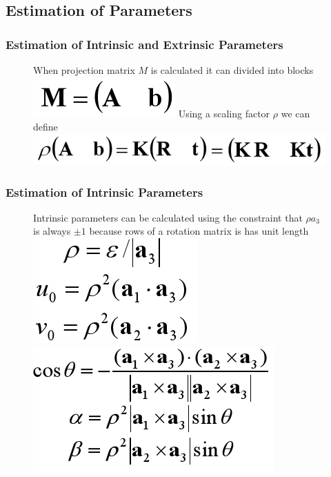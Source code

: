 \documentclass[11pt]{beamer}
\begin{document}
\subsection{Estimation of Parameters}
\begin{frame}
\frametitle{Estimation of Intrinsic and Extrinsic Parameters}
\begin{figure}
\centering
When projection matrix $M$ is calculated it can divided into blocks\vfill
\includegraphics[width=.3\textwidth]{mab.png}\vfill
Using a scaling factor $\rho$ we can define 
\includegraphics[width=.5\textwidth]{rab.png}
\end{figure}
\end{frame}

\begin{frame}
\frametitle{Estimation of Intrinsic Parameters}
\begin{figure}
\centering
Intrinsic parameters can be calculated using the constraint that $\rho a_3$ is always $\pm1$ because rows of a rotation matrix is has unit length\vfill
\includegraphics[width=.3\textwidth]{rouv.png}\vfill
\includegraphics[width=.5\textwidth]{theta_alpha_beta.png}
\end{figure}
\end{frame}
\end{document}
